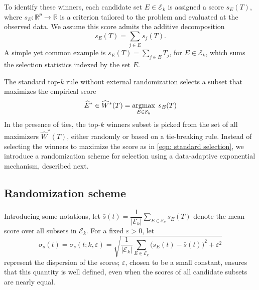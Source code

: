 \documentclass[12pt]{article}
\def\argmax{\mathop{\rm argmax}\limits}
\newcommand{\real}{\mathbb{R}}
\newcommand{\Ek}{\mathcal{E}_{k}}      %
\newcommand{\Eone}{\widehat{E}^*}  %
\newcommand{\Estar}{\widehat{W}^*}
\newcommand{\snoise}{\sigma_{s}}
\begin{document}
To identify these winners, each candidate set $E \in \Ek$ is assigned a score $s_E(T)$, where $s_E: \real^p \to \real$ is a criterion tailored to the problem and evaluated at the observed data.
We assume this score admits the additive decomposition
$$
s_E(T) =\sum_{j\in E}s_j(T).
$$
A simple yet common example is $s_E(T) = \sum_{j \in E} T_j$, for $E \in \Ek$, which sums the selection statistics indexed by the set $E$. 

The standard top-$k$ rule without external randomization selects a  subset that maximizes the empirical score 
\begin{equation}
    \Eone \in  \Estar(T) = \argmax_{E \in \Ek} \; s_E(T) 
    \label{eqn: standard selection} 
\end{equation} 
In the presence of ties, the top-$k$ winners subset is picked from the set of all maximizers $\Estar(T)$, either randomly or based on a tie-breaking rule. 
Instead of selecting the winners to maximize the score as in \eqref{eqn: standard selection}, we introduce a randomization scheme for selection using a data-adaptive exponential mechanism, described next.


\subsection{Randomization scheme}
\label{sec:exp:mechanism}

Introducing some notations, let $\bar{s}(t)= \dfrac{1}{|\Ek|}\sum_{E \in \mathcal{E}_k} s_E(T)$ denote the mean score over all subsets in $\mathcal{E}_k$. 
For a fixed $\varepsilon>0$, let 
$$
\snoise(t ) =\snoise(t; k, \varepsilon)= \sqrt{
    \frac{1}{|\mathcal{E}_k|}
    \sum_{E \in \mathcal{E}_k}
    \bigl(s_E(t) - \bar{s}(t)\bigr)^2 + \varepsilon^2}
$$ 
represent the dispersion of the scores; $\varepsilon$, chosen to be a small constant, ensures that this quantity is well defined, even when the scores of all candidate subsets are nearly equal.
\end{document}
